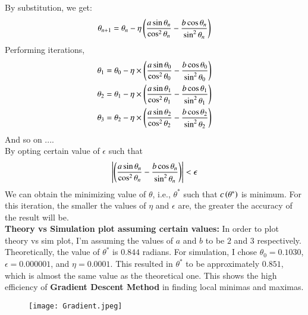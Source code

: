 \documentclass[journal,12pt,onecolumn]{IEEEtran}
\theoremstyle{remark}
\begin{document}
By substitution, we get:
 \begin{align}
     \theta_{n+1} = \theta_n - \eta \left( \frac{a \sin\theta_n}{\cos^2\theta_n} - \frac{b \cos\theta_n}{\sin^2\theta_n} \right)
 \end{align}
Performing iterations,
\begin{align}
\theta_{1} &= \theta_0 - \eta \times  \left( \frac{a \sin\theta_0}{\cos^2\theta_0} - \frac{b \cos\theta_0}{\sin^2\theta_0} \right)\\
\theta_{2} &= \theta_1 - \eta \times  \left( \frac{a \sin\theta_1}{\cos^2\theta_1} - \frac{b \cos\theta_1}{\sin^2\theta_1} \right)\\
       \theta_{3} &= \theta_2 - \eta \times \left( \frac{a \sin\theta_2}{\cos^2\theta_2} - \frac{b \cos\theta_2}{\sin^2\theta_2} \right)
\end{align}
And so on ....\\
By opting certain value of $\epsilon$ such that 
\begin{align}
\left\lvert  \left( \frac{a \sin\theta_n}{\cos^2\theta_n} - \frac{b \cos\theta_n}{\sin^2\theta_n} \right) \right\rvert < \epsilon
\end{align}
We can obtain the minimizing value of $\theta$, i.e., $\theta^*$ such that $c\left(\theta^*\right)$ is minimum. For this iteration, the smaller the values of $\eta$ and $\epsilon$ are, the greater the accuracy of the result will be.\\
\textbf{Theory vs Simulation plot assuming certain values:}
In order to plot theory vs sim plot, I'm assuming the values of $a$ and $b$ to be $2$ and $3$ respectively. Theoretically, the value of $\theta^*$ is $0.844$ radians. For simulation, I chose $\theta_0 = 0.1030$, $\epsilon = 0.000001$, and $\eta=0.0001$. This resulted in $\theta^*$ to be approximately $ 0.851$, which is almost the same value as the theoretical one. This shows the high efficiency of \textbf{Gradient Descent Method} in finding local minimas and maximas.

\begin{figure}[h]  
    \centering  
    \texttt{[image: Gradient.jpeg]}   
    \label{fig:label}  
\end{figure}

 
\end{document}
